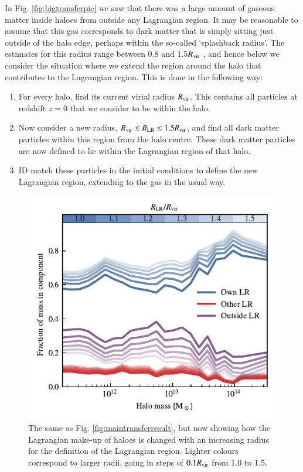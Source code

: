 In Fig. \ref{fig:bigtransferpic} we saw that there was a large amount of
gaseous matter inside haloes from outside any Lagrangian region. It may be
reasonable to assume that this gas corresponds to dark matter that is simply
sitting just outside of the halo edge, perhaps within the so-called
`splashback radius'. The estimates for this radius range between 0.8 and
1.5$R_{\rm vir}$ \citep{More2015, Diemer2017a}, and hence below we consider
the situation where we extend the region around the halo that contributes to
the Lagrangian region. This is done in the following way:
\begin{enumerate}
	\item For every halo, find its current virial radius $R_{\rm vir}$. This contains
	      all particles at redshift $z=0$ that we consider to be within the halo.
    \item Now consider a new radius, $R_{\rm vir} \leq R_{\rm LR} \leq 1.5
		R_{\rm vir}$, and find all dark matter particles within this region
		from the halo centre. These dark matter particles are now defined to
		lie within the Lagrangian region of that halo.
    \item ID match these particles in the initial conditions to define the new
        Lagrangian region, extending to the gas in the usual way.
\end{enumerate}
\begin{figure}
    \centering
    \includegraphics{figures/radius_convergence.pdf}
    \vspace{-0.7cm}
    \caption{The same as Fig. \ref{fig:maintransferresult}, but now showing
    how the Lagrangian make-up of haloes is changed with an increasing radius
    for the definition of the Lagrangian region. Lighter colours correspond
    to larger radii, going in steps of $0.1R_{\rm vir}$ from 1.0 to 1.5.}
    \label{fig:radius_dependence}
\end{figure}
